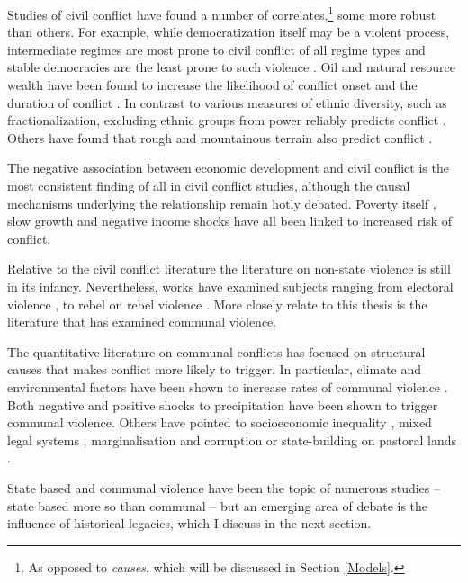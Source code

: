 Studies of civil conflict have found a number of correlates,\footnote{As opposed
to \textit{causes}, which will be discussed in Section \ref{Models}.} some more
robust than others. For example, while democratization itself may be a violent
process, intermediate regimes are most prone to civil conflict of all regime
types and stable democracies are the least prone to such violence
\citep{Hegre2001, Goldstone_2010}. Oil and natural resource wealth have been
found to increase the likelihood of conflict onset and the duration of conflict
\citep{Lujala2010, Lujala2005, Lujala_2008, Ross_2006}. In contrast to various
measures of ethnic diversity, such as fractionalization, excluding ethnic groups
from power reliably predicts conflict \citep{CedermanLars-Erik2013Igac}. Others
have found that rough and mountainous terrain also predict conflict
\citep{Buhaug_2010, Hegre2006}.

The negative association between economic development and civil conflict is the
most consistent finding of all in civil conflict studies, although the causal
mechanisms underlying the relationship remain hotly debated. Poverty itself
\citep{Hegre2006}, slow growth \citep{Hegre2006} and negative income shocks have
all been linked to increased risk of conflict.

Relative to the civil conflict literature the literature on non-state violence
is still in its infancy. Nevertheless, works have examined subjects ranging from
electoral violence \citep{Fjelde_2020, Salehyan_2014, Burchard_2015}, to rebel
on rebel violence \citep{Fjelde_2012, Lilja_2011, Cunningham_2012, Nygard_2014}.
More closely relate to this thesis is the literature that has examined communal
violence.

The quantitative literature on communal conflicts has focused on structural
causes that makes conflict more likely to trigger. In particular, climate and
environmental factors have been shown to increase rates of communal violence
\citep{Turner_2011}. Both negative \citep{Detges_2017, Fjelde2012,
van_Weezel_2019, Petrova_2022} and positive \citep{Theisen2012, Witsenburg2012}
shocks to precipitation have been shown to trigger communal violence. Others
have pointed to socioeconomic inequality \citep{Fjelde2014, PETERS_2004}, mixed
legal systems \citep{Eck2014}, marginalisation and corruption
\citep{BENJAMINSEN_2009} or state-building on pastoral lands
\citep{hagmann2008pastoral}.

State based and communal violence have been the topic of numerous studies --
state based more so than communal -- but an emerging area of debate is the
influence of historical legacies, which I discuss in the next section. 

